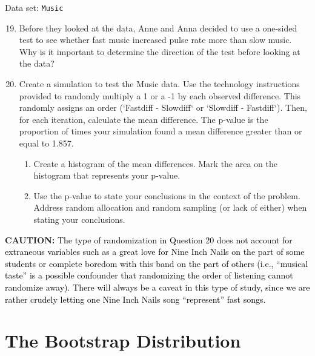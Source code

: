 \documentclass[
]{report}
\theoremstyle{definition}
\theoremstyle{definition}
\theoremstyle{definition}
\theoremstyle{definition}
\theoremstyle{remark}
\begin{document}
Data set: \texttt{Music}

\begin{enumerate}
  \setcounter{enumi}{18}  

  \item Before they looked at the data, Anne and Anna decided to use a one-sided test to see whether fast
  music increased pulse rate more than slow music. Why is it important to determine the direction of the
  test before looking at the data?

  \item Create a simulation to test the Music data. Use the technology instructions provided to randomly
  multiply a 1 or a -1 by each observed difference. This randomly assigns an order (`Fastdiff -
  Slowdiff` or `Slowdiff - Fastdiff`). Then, for each iteration, calculate the mean difference. The
  p-value is the proportion of times your simulation found a mean difference greater than or equal to
  1.857.
  \begin{enumerate}
    \item Create a histogram of the mean differences. Mark the area on the histogram that represents your p-value.

    \item Use the p-value to state your conclusions in the context of the problem. Address random allocation
    and random sampling (or lack of either) when stating your conclusions.
  \end{enumerate}
\end{enumerate}

\large

\textbf{CAUTION:}
\textcolor{black}{The type of randomization in Question 20 does not account for extraneous variables such as a great love
for Nine Inch Nails on the part of some students or complete boredom with this band on the part of others
(i.e., “musical taste” is a possible confounder that randomizing the order of listening cannot randomize
away). There will always be a caveat in this type of study, since we are rather crudely letting one Nine
Inch Nails song “represent” fast songs.}

\hypertarget{the-bootstrap-distribution}{%
\section{\texorpdfstring{\textbf{The Bootstrap Distribution}}{The Bootstrap Distribution}}\label{the-bootstrap-distribution}}

\normalsize
\end{document}

